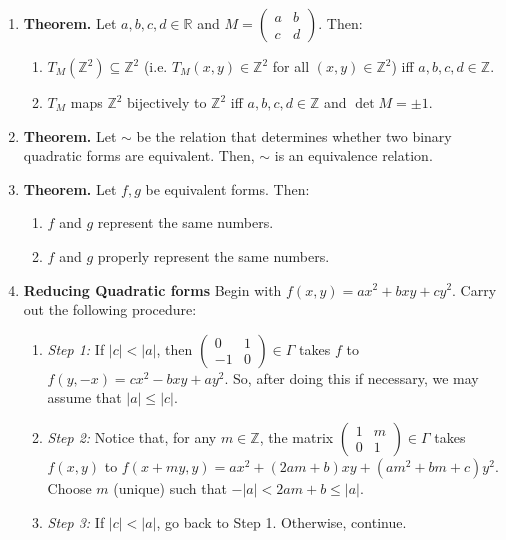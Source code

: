 \documentclass[11pt]{article}
\theoremstyle{definition}
\theoremstyle{named}
\begin{document}
\begin{enumerate}
    \item \textbf{Theorem. } Let $a,b,c,d \in \mathbb{R}$ and $M=\begin{pmatrix}
        a & b\\
        c & d
    \end{pmatrix}$. Then: 
    \begin{enumerate}
        \item $T_M(\mathbb{Z}^2) \subseteq \mathbb{Z}^2$ (i.e. $T_M(x,y) \in \mathbb{Z}^2$ for all $(x,y) \in \mathbb{Z}^2$) iff $a,b,c,d \in \mathbb{Z}$. 
        \item $T_M$ maps $\mathbb{Z}^2$ bijectively to $\mathbb{Z}^2$ iff $a,b,c,d \in \mathbb{Z}$ and $\det M = \pm 1$. 
    \end{enumerate}
    \item \textbf{Theorem. } Let $\sim$ be the relation that determines whether two binary quadratic forms are equivalent. Then, $\sim$ is an equivalence relation. 
    \item \textbf{Theorem. } Let $f,g$ be equivalent forms. Then: 
    \begin{enumerate}
        \item $f$ and $g$ represent the same numbers. 
        \item $f$ and $g$ properly represent the same numbers. 
    \end{enumerate}
    \item \textbf{Reducing Quadratic forms} Begin with $f(x,y) = ax^2 + bxy + cy^2$. Carry out the following procedure: 
    \begin{enumerate}
        \item \textit{Step 1: } If $|c| < |a|$, then $\begin{pmatrix}
            0 & 1 \\
            -1 & 0
        \end{pmatrix} \in \Gamma$ takes $f$ to $f(y,-x) = cx^2 - bxy + ay^2$. So, after doing this if necessary, we may assume that $|a| \leq |c|$. 
        \item \textit{Step 2: } Notice that, for any $m \in \mathbb{Z}$, the matrix $\begin{pmatrix}
            1 & m \\
            0 & 1
        \end{pmatrix} \in \Gamma$ takes $f(x,y)$ to $f(x+my,y) = ax^2 + (2am+b)xy + (am^2 + bm + c)y^2$. Choose $m$ (unique) such that $-|a| < 2am + b \leq |a|$. 
        \item \textit{Step 3: } If $|c| < |a|$, go back to Step 1. Otherwise, continue. 

\end{enumerate}
\end{enumerate}
\end{document}
